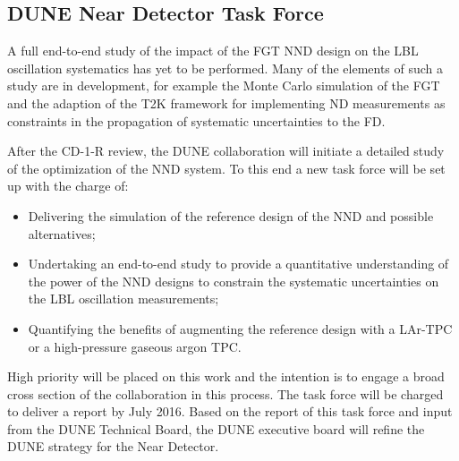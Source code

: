 \subsection{DUNE Near Detector Task Force}

A full end-to-end study of the impact of the FGT NND design on the LBL oscillation 
systematics has yet to be performed. Many of the elements of such a study are in 
development, for example the Monte Carlo simulation of the FGT and the adaption 
of the T2K framework for implementing ND measurements as constraints in the propagation 
of systematic uncertainties to the FD. 

After the CD-1-R review, the DUNE collaboration will initiate a detailed study 
of the optimization of the NND system. To this end a new task force will be set 
up with the charge of:

\begin{itemize}
\item Delivering the simulation of the reference design of the NND and possible alternatives;

\item Undertaking an end-to-end study to provide a quantitative understanding of 
the power of the NND designs to constrain the systematic uncertainties on the LBL 
oscillation measurements;

\item Quantifying the benefits of augmenting the reference design with a LAr-TPC 
or a high-pressure gaseous argon TPC.
\end{itemize}

High priority will be placed on this work and the intention is to engage a broad 
cross section of the collaboration in this process. The task force will be charged 
to deliver a report by July 2016. Based on the report of this task force and input 
from the DUNE Technical Board, the DUNE executive board will refine the DUNE strategy 
for the Near Detector.
